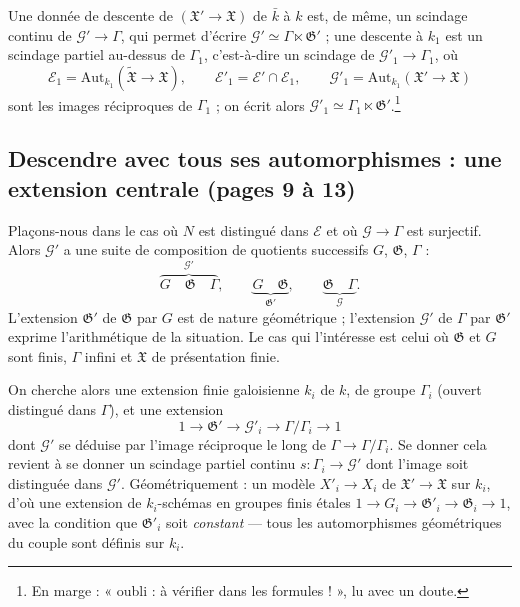 \documentclass[11pt,a4paper]{article}
\begin{document}
Une donnée de descente de $(\mathfrak{X}' \to \mathfrak{X})$ de $\bar{k}$ à $k$
est, de même, un scindage continu de $\mathcal{G}' \to \Gamma$, qui permet
d'écrire $\mathcal{G}' \simeq \Gamma \ltimes \mathfrak{G}'$ ; une descente à
$k_{1}$ est un scindage partiel au-dessus de $\Gamma_{1}$, c'est-à-dire un
scindage de $\mathcal{G}'_{1} \to \Gamma_{1}$, où
\[
\mathcal{E}_{1} = \mathrm{Aut}_{k_{1}}(\widetilde{\mathfrak{X}} \to \mathfrak{X}),
\qquad
\mathcal{E}'_{1} = \mathcal{E}' \cap \mathcal{E}_{1},
\qquad
\mathcal{G}'_{1} = \mathrm{Aut}_{k_{1}}(\mathfrak{X}' \to \mathfrak{X})
\]
sont les images réciproques de $\Gamma_{1}$ ; on écrit alors
$\mathcal{G}'_{1} \simeq \Gamma_{1} \ltimes \mathfrak{G}'$.\footnote{En marge :
« oubli : à vérifier dans les formules ! », lu avec un doute.}

\subsection*{Descendre avec tous ses automorphismes : une extension centrale
(pages 9 à 13)}

Plaçons-nous dans le cas où $N$ est distingué dans $\mathcal{E}$ et où
$\mathcal{G} \to \Gamma$ est surjectif. Alors $\mathcal{G}'$ a une suite de
composition de quotients successifs $G$, $\mathfrak{G}$, $\Gamma$ :
\[
\overbrace{G \quad \mathfrak{G} \quad \Gamma}^{\mathcal{G}'}, \qquad
\underbrace{G \quad \mathfrak{G}}_{\mathfrak{G}'}, \qquad
\underbrace{\mathfrak{G} \quad \Gamma}_{\mathcal{G}} .
\]
L'extension $\mathfrak{G}'$ de $\mathfrak{G}$ par $G$ est de nature
géométrique ; l'extension $\mathcal{G}'$ de $\Gamma$ par $\mathfrak{G}'$
exprime l'arithmétique de la situation. Le cas qui l'intéresse est celui où
$\mathfrak{G}$ et $G$ sont finis, $\Gamma$ infini et $\mathfrak{X}$ de
présentation finie.

On cherche alors une extension finie galoisienne $k_{i}$ de $k$, de groupe
$\Gamma_{i}$ (ouvert distingué dans $\Gamma$), et une extension
\[
1 \to \mathfrak{G}' \to \mathcal{G}'_{i} \to \Gamma/\Gamma_{i} \to 1
\]
dont $\mathcal{G}'$ se déduise par l'image réciproque le long de $\Gamma \to
\Gamma/\Gamma_{i}$. Se donner cela revient à se donner un scindage partiel
continu $s : \Gamma_{i} \to \mathcal{G}'$ dont l'image soit distinguée dans
$\mathcal{G}'$. Géométriquement : un modèle $X'_{i} \to X_{i}$ de
$\mathfrak{X}' \to \mathfrak{X}$ sur $k_{i}$, d'où une extension de
$k_{i}$-schémas en groupes finis étales $1 \to G_{i} \to \mathfrak{G}'_{i} \to
\mathfrak{G}_{i} \to 1$, avec la condition que $\mathfrak{G}'_{i}$ soit
\emph{constant} --- tous les automorphismes géométriques du couple sont
définis sur $k_{i}$.
\end{document}
